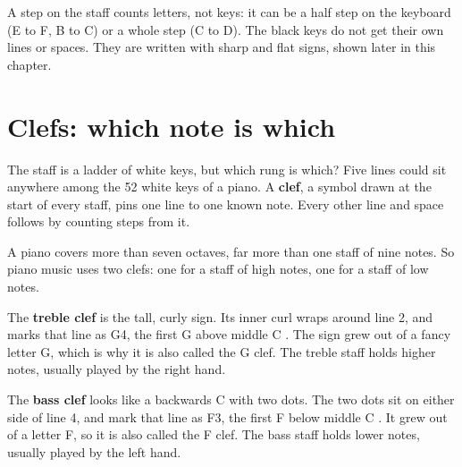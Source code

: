 A step on the staff counts letters, not keys: it can be a half step on the keyboard (E to F, B to C) or a whole step (C to D). The black keys do not get their own lines or spaces. They are written with sharp and flat signs, shown later in this chapter.

\section{Clefs: which note is which}

The staff is a ladder of white keys, but which rung is which? Five lines could sit anywhere among the 52 white keys of a piano. A \textbf{clef}, a symbol drawn at the start of every staff, pins one line to one known note. Every other line and space follows by counting steps from it.

A piano covers more than seven octaves, far more than one staff of nine notes. So piano music uses two clefs: one for a staff of high notes, one for a staff of low notes.

The \textbf{treble clef} is the tall, curly sign. Its inner curl wraps around line 2, and marks that line as G4, the first G above middle C . The sign grew out of a fancy letter G, which is why it is also called the G clef. The treble staff holds higher notes, usually played by the right hand.

The \textbf{bass clef} looks like a backwards C with two dots. The two dots sit on either side of line 4, and mark that line as F3, the first F below middle C . It grew out of a letter F, so it is also called the F clef. The bass staff holds lower notes, usually played by the left hand.

